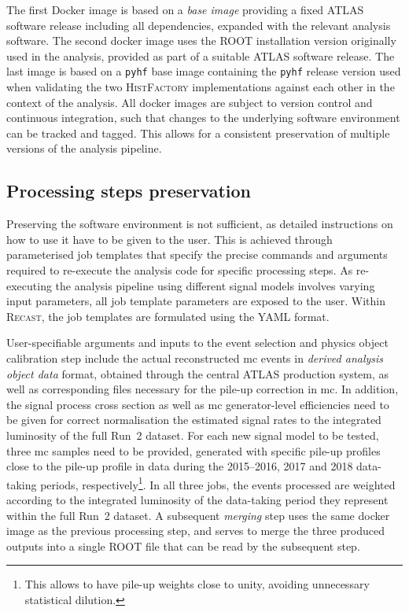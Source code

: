 The first Docker image is based on a \textit{base image} providing a fixed ATLAS software release including all dependencies, expanded with the relevant analysis software. The second docker image uses the \textsc{ROOT} installation version originally used in the analysis, provided as part of a suitable ATLAS software release. The last image is based on a \texttt{pyhf} base image containing the \texttt{pyhf} release version used when validating the two \textsc{HistFactory} implementations against each other in the context of the analysis. All docker images are subject to version control and continuous integration, such that changes to the underlying software environment can be tracked and tagged. This allows for a consistent preservation of multiple versions of the analysis pipeline. 

\subsection{Processing steps preservation}

Preserving the software environment is not sufficient, as detailed instructions on how to use it have to be given to the user. This is achieved through parameterised job templates that specify the precise commands and arguments required to re-execute the analysis code for specific processing steps. As re-executing the analysis pipeline using different signal models involves varying input parameters, all job template parameters are exposed to the user. Within \textsc{Recast}, the job templates are formulated using the YAML format. 

User-specifiable arguments and inputs to the event selection and physics object calibration step include the actual reconstructed \gls{mc} events in \textit{derived analysis object data} format, obtained through the central ATLAS production system, as well as corresponding files necessary for the pile-up correction in \gls{mc}. In addition, the signal process cross section as well as \gls{mc} generator-level efficiencies need to be given for correct normalisation the estimated signal rates to the integrated luminosity of the full Run~2 dataset. For each new signal model to be tested, three \gls{mc} samples need to be provided, generated with specific pile-up profiles close to the pile-up profile in data during the 2015--2016, 2017 and 2018 data-taking periods, respectively\footnote{This allows to have pile-up weights close to unity, avoiding unnecessary statistical dilution.}. In all three jobs, the events processed are weighted according to the integrated luminosity of the data-taking period they represent within the full Run~2 dataset. A subsequent \textit{merging} step uses the same docker image as the previous processing step, and serves to merge the three produced outputs into a single \textsc{ROOT} file that can be read by the subsequent step.


